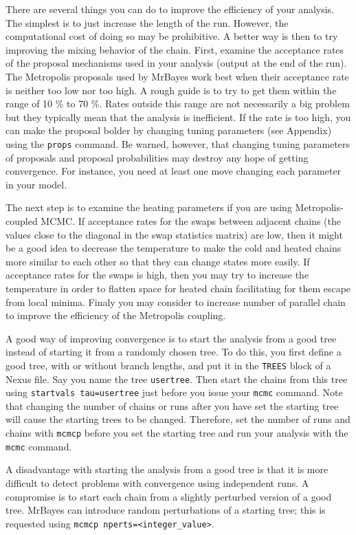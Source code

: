 \documentclass[12pt]{book}
\begin{document}
There are several things you can do to improve the efficiency of your analysis. The simplest is to
just increase the length of the run. However, the computational cost of doing so may be
prohibitive. A better way is then to try improving the mixing behavior of the chain. First, examine
the acceptance rates of the proposal mechanisms used in your analysis (output at the end of the
run). The Metropolis proposals used by MrBayes work best when their acceptance rate is neither too
low nor too high. A rough guide is to try to get them within the range of 10 \% to 70 \%. Rates
outside this range are not necessarily a big problem but they typically mean that the analysis is
inefficient. If the rate is too high, you can make the proposal bolder by changing tuning
parameters (see Appendix) using the \texttt{props} command. Be warned, however, that changing
tuning parameters of proposals and proposal probabilities may destroy any hope of getting
convergence. For instance, you need at least one move changing each parameter in your model.

The next step is to examine the heating parameters if you are using Metropolis-coupled MCMC. If
acceptance rates for the swaps between adjacent chains (the values close to the diagonal in the
swap statistics matrix) are low, then it might be a good idea to decrease the temperature to make
the cold and heated chains more similar to each other so that they can change states more easily.
If acceptance rates for the swaps is high, then you may try to increase the temperature in order to
flatten space for heated chain facilitating for them escape from local minima. Finaly you may
consider to increase number of parallel chain to improve the efficiency of the Metropolis coupling.

A good way of improving convergence is to start the analysis from a good tree instead of starting
it from a randomly chosen tree. To do this, you first define a good tree, with or without branch
lengths, and put it in the \texttt{TREES} block of a Nexus file. Say you name the tree
\texttt{usertree}.  Then start the chains from this tree using \texttt{startvals tau=usertree} just
before you issue your \texttt{mcmc} command. Note that changing the number of chains or runs after
you have set the starting tree will cause the starting trees to be changed. Therefore, set the
number of runs and chains with \texttt{mcmcp} before you set the starting tree and run your
analysis with the \texttt{mcmc} command.

A disadvantage with starting the analysis from a good tree is that it is more difficult to detect
problems with convergence using independent runs. A compromise is to start each chain from a
slightly perturbed version of a good tree. MrBayes can introduce random perturbations of a starting
tree; this is requested using \texttt{mcmcp nperts=<integer\_value>}.
\end{document}
